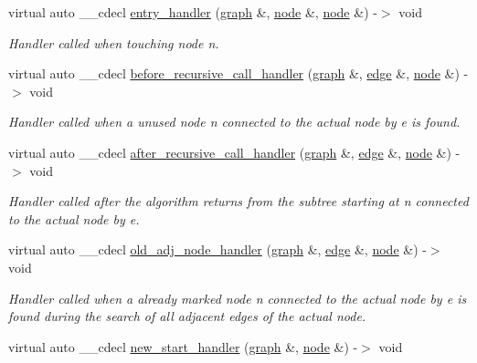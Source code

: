 \begin{DoxyCompactItemize}
virtual auto \+\_\+\+\_\+cdecl \mbox{\hyperlink{classbiconnectivity_a50b1ca6398fa0228e99a051855617315}{entry\+\_\+handler}} (\mbox{\hyperlink{classgraph}{graph}} \&, \mbox{\hyperlink{classnode}{node}} \&, \mbox{\hyperlink{classnode}{node}} \&) -\/$>$ void
\begin{DoxyCompactList}\small\item\em Handler called when touching node {\itshape n}. \end{DoxyCompactList}\item 
virtual auto \+\_\+\+\_\+cdecl \mbox{\hyperlink{classbiconnectivity_ad618a245ee50ad0356b244920689f1c8}{before\+\_\+recursive\+\_\+call\+\_\+handler}} (\mbox{\hyperlink{classgraph}{graph}} \&, \mbox{\hyperlink{classedge}{edge}} \&, \mbox{\hyperlink{classnode}{node}} \&) -\/$>$ void
\begin{DoxyCompactList}\small\item\em Handler called when a unused node {\itshape n} connected to the actual node by {\itshape e} is found. \end{DoxyCompactList}\item 
virtual auto \+\_\+\+\_\+cdecl \mbox{\hyperlink{classbiconnectivity_a97dc2fa637bb39fc108e2ed644fe2884}{after\+\_\+recursive\+\_\+call\+\_\+handler}} (\mbox{\hyperlink{classgraph}{graph}} \&, \mbox{\hyperlink{classedge}{edge}} \&, \mbox{\hyperlink{classnode}{node}} \&) -\/$>$ void
\begin{DoxyCompactList}\small\item\em Handler called after the algorithm returns from the subtree starting at {\itshape n} connected to the actual node by {\itshape e}. \end{DoxyCompactList}\item 
virtual auto \+\_\+\+\_\+cdecl \mbox{\hyperlink{classbiconnectivity_a88f74ebbf09a22bb657dc30217c93158}{old\+\_\+adj\+\_\+node\+\_\+handler}} (\mbox{\hyperlink{classgraph}{graph}} \&, \mbox{\hyperlink{classedge}{edge}} \&, \mbox{\hyperlink{classnode}{node}} \&) -\/$>$ void
\begin{DoxyCompactList}\small\item\em Handler called when a already marked node {\itshape n} connected to the actual node by {\itshape e} is found during the search of all adjacent edges of the actual node. \end{DoxyCompactList}\item 
virtual auto \+\_\+\+\_\+cdecl \mbox{\hyperlink{classbiconnectivity_a64424eec8e317b08605f8b6b952bace4}{new\+\_\+start\+\_\+handler}} (\mbox{\hyperlink{classgraph}{graph}} \&, \mbox{\hyperlink{classnode}{node}} \&) -\/$>$ void

\end{DoxyCompactItemize}
